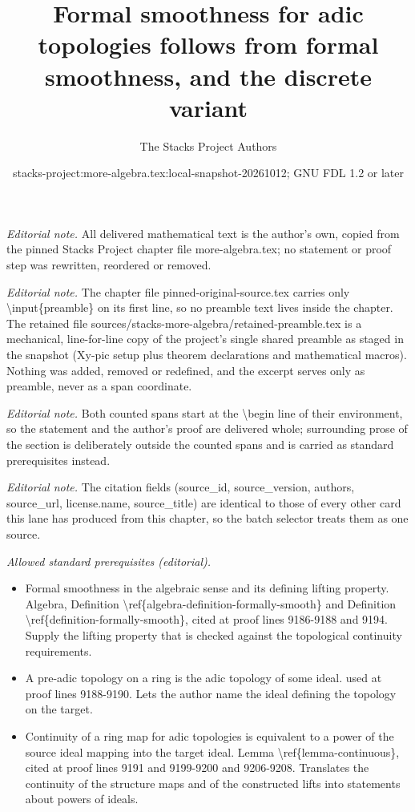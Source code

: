 \documentclass[10pt,a4paper]{amsart}
\title{Formal smoothness for adic topologies follows from formal smoothness, and the discrete variant}
\author{The Stacks Project Authors}
\date{stacks-project:more-algebra.tex:local-snapshot-20261012; GNU FDL 1.2 or later}
\theoremstyle{plain}
\theoremstyle{definition}
\theoremstyle{remark}
\numberwithin{equation}{subsection}
\begin{document}
\maketitle
\setcounter{subsection}{1}
\noindent\textit{Editorial note.} All delivered mathematical text is the author's own, copied from the pinned Stacks Project chapter file more-algebra.tex; no statement or proof step was rewritten, reordered or removed.\par\medskip
\noindent\textit{Editorial note.} The chapter file pinned-original-source.tex carries only \textbackslash{}input\{preamble\} on its first line, so no preamble text lives inside the chapter. The retained file sources/stacks-more-algebra/retained-preamble.tex is a mechanical, line-for-line copy of the project's single shared preamble as staged in the snapshot (Xy-pic setup plus theorem declarations and mathematical macros). Nothing was added, removed or redefined, and the excerpt serves only as preamble, never as a span coordinate.\par\medskip
\noindent\textit{Editorial note.} Both counted spans start at the \textbackslash{}begin line of their environment, so the statement and the author's proof are delivered whole; surrounding prose of the section is deliberately outside the counted spans and is carried as standard prerequisites instead.\par\medskip
\noindent\textit{Editorial note.} The citation fields (source\_id, source\_version, authors, source\_url, license.name, source\_title) are identical to those of every other card this lane has produced from this chapter, so the batch selector treats them as one source.\par\medskip
\noindent\textit{Allowed standard prerequisites (editorial).}\begin{itemize}
\item Formal smoothness in the algebraic sense and its defining lifting property. Algebra, Definition \textbackslash{}ref\{algebra-definition-formally-smooth\} and Definition \textbackslash{}ref\{definition-formally-smooth\}, cited at proof lines 9186-9188 and 9194. Supply the lifting property that is checked against the topological continuity requirements.
\item A pre-adic topology on a ring is the adic topology of some ideal. used at proof lines 9188-9190. Lets the author name the ideal defining the topology on the target.
\item Continuity of a ring map for adic topologies is equivalent to a power of the source ideal mapping into the target ideal. Lemma \textbackslash{}ref\{lemma-continuous\}, cited at proof lines 9191 and 9199-9200 and 9206-9208. Translates the continuity of the structure maps and of the constructed lifts into statements about powers of ideals.
\end{itemize}\medskip
\end{document}

